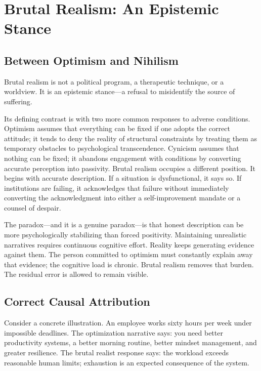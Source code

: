 \documentclass[12pt, a4paper]{article}
\theoremstyle{plain}
\theoremstyle{definition}
\theoremstyle{remark}
\begin{document}
\section{Brutal Realism: An Epistemic Stance}

\subsection{Between Optimism and Nihilism}

Brutal realism is not a political program, a therapeutic technique, or a worldview.
It is an epistemic stance---a refusal to misidentify the source of suffering.

Its defining contrast is with two more common responses to adverse conditions.
Optimism assumes that everything can be fixed if one adopts the correct attitude;
it tends to deny the reality of structural constraints by treating them as temporary
obstacles to psychological transcendence.
Cynicism assumes that nothing can be fixed; it abandons engagement with conditions
by converting accurate perception into passivity.
Brutal realism occupies a different position.
It begins with accurate description.
If a situation is dysfunctional, it says so.
If institutions are failing, it acknowledges that failure without immediately converting
the acknowledgment into either a self-improvement mandate or a counsel of despair.

The paradox---and it is a genuine paradox---is that honest description can be more
psychologically stabilizing than forced positivity.
Maintaining unrealistic narratives requires continuous cognitive effort.
Reality keeps generating evidence against them.
The person committed to optimism must constantly explain away that evidence;
the cognitive load is chronic.
Brutal realism removes that burden.
The residual error is allowed to remain visible.

\subsection{Correct Causal Attribution}

Consider a concrete illustration.
An employee works sixty hours per week under impossible deadlines.
The optimization narrative says: you need better productivity systems, a better
morning routine, better mindset management, and greater resilience.
The brutal realist response says: the workload exceeds reasonable human limits;
exhaustion is an expected consequence of the system.
\end{document}

